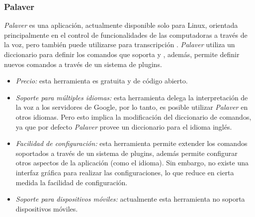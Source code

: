 \subsubsection{Palaver}
\label{sec:palaver}

\emph{Palaver} es una aplicaci\'on, actualmente disponible solo para Linux, orientada principalmente
en el control de funcionalidades de las computadoras a trav\'es de la voz, pero tambi\'en
puede utilizarse para transcripci\'on \cite{Palaver}. \emph{Palaver} utiliza un diccionario para
definir los comandos que soporta y , adem\'as, permite definir nuevos comandos a trav\'es
de un sistema de plugins.

\begin{itemize}
    \item \emph{Precio:} esta herramienta es gratuita y de c\'odigo abierto.
    \item \emph{Soporte para m\'ultiples idiomas:} esta herramienta delega la interpretaci\'on de
	la voz a los servidores de Google, por lo tanto, es posible utilizar \emph{Palaver} en otros idiomas. Pero
	esto implica la modificaci\'on del diccionario de comandos, ya que por defecto \emph{Palaver} provee
	un diccionario para el idioma ingl\'es.
    \item \emph{Facilidad de configuraci\'on:} esta herramienta permite extender los comandos soportados a trav\'es de
	un sistema de plugins, adem\'as permite configurar otros aspectos de la aplicaci\'on (como el idioma). Sin embargo,
	no existe una interfaz gr\'afica para realizar las configuraciones, lo que reduce en cierta medida la facilidad
	de configuraci\'on.
    \item \emph{Soporte para dispositivos m\'oviles:} actualmente esta herramienta no soporta dispositivos m\'oviles.
\end{itemize}
